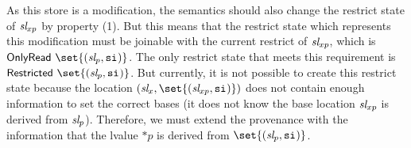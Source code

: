 As this store is a modification, the semantics should also change the restrict state of $\textit{sl}_{xp}$ by property (1).
But this means that the restrict state which represents this modification must be joinable with the current restrict of $\textit{sl}_{xp}$, which is $\onlyread{\set{(\Simplelocvar_{p}, \scope{})}}$.
The only restrict state that meets this requirement is $\restricted{\set{(\Simplelocvar_{p}, \scope{})}}$.
But currently, it is not possible to create this restrict state because the location $(\Simplelocvar_x, \set{(\Simplelocvar_{xp}, \scope{})})$
does not contain enough information to set the correct bases (\ie it does not know the base location $\textit{sl}_{xp}$ is derived from $\textit{sl}_p$).
Therefore, we must extend the provenance with the information that the lvalue $*p$ is derived from $\set{(\Simplelocvar_p, \scope{})}$.

